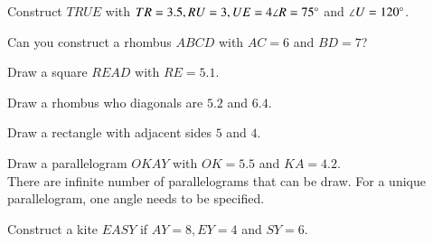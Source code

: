 \item Construct $TRUE$ with $TR = 3.5, RU = 3, UE = 4 \angle R = 75\degree$ and $\angle U = 120\degree$.
\\
\solution 




\item Can you construct a rhombus $ABCD$ with $AC = 6$ and $BD = 7$?
\item Draw a square $READ$ with $RE = 5.1$.
\\
\solution 

\item Draw a rhombus who diagonals are $5.2$ and $6.4$.
\item Draw a rectangle with adjacent sides $5$ and $4$.
\\
\solution 


\item Draw a parallelogram $OKAY$ with $OK = 5.5$ and $KA = 4.2$.
\\
\solution  There are infinite number of parallelograms that can be draw.  For a unique parallelogram, one angle
needs to be specified.

\item Construct a kite $EASY$ if $AY = 8, EY = 4$ and $SY = 6$.


%
